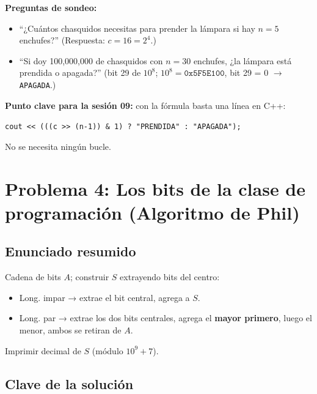 \documentclass[12pt, oneside]{article}
\begin{document}
\begin{notaprofesor}
  \textbf{Preguntas de sondeo:}
  \begin{itemize}
    \item ``¿Cuántos chasquidos necesitas para prender la lámpara si hay
          $n=5$ enchufes?'' (Respuesta: $c=16=2^4$.)
    \item ``Si doy 100{,}000{,}000 de chasquidos con $n=30$ enchufes, ¿la lámpara
          está prendida o apagada?'' (bit 29 de $10^8$; $10^8=\texttt{0x5F5E100}$,
          bit 29 = 0 $\to$ \texttt{APAGADA}.)
  \end{itemize}

  \textbf{Punto clave para la sesión 09:} con la fórmula basta una línea en C++:
  \begin{center}
    \texttt{cout << (((c >> (n-1)) \& 1) ? "PRENDIDA" : "APAGADA");}
  \end{center}
  No se necesita ningún bucle.
\end{notaprofesor}

\newpage

\section{Problema 4: Los bits de la clase de programación (Algoritmo de Phil)}

\subsection{Enunciado resumido}

Cadena de bits $A$; construir $S$ extrayendo bits del centro:
\begin{itemize}
  \item Long. impar → extrae el bit central, agrega a $S$.
  \item Long. par → extrae los dos bits centrales, agrega el \textbf{mayor
        primero}, luego el menor, ambos se retiran de $A$.
\end{itemize}
Imprimir decimal de $S$ (módulo $10^9+7$).

\subsection{Clave de la solución}
\end{document}
